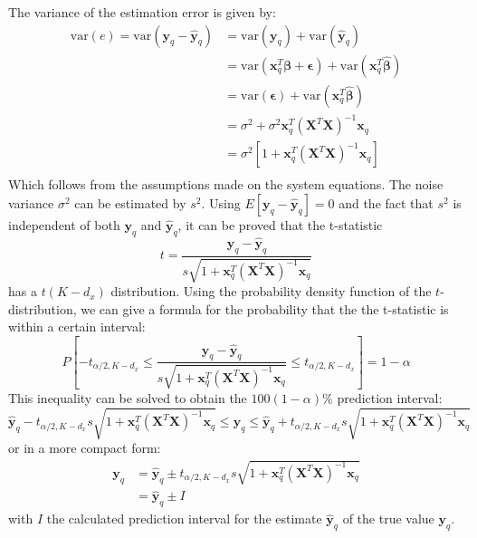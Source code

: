 The variance of the estimation error is given by:
$$
\begin{aligned}
	\textrm{var}(e) = \textrm{var}( \mathbf{y}_q-\hat{\mathbf{y}}_q ) 
	&= \textrm{var}( \mathbf{y}_q ) + \textrm{var}( \hat{\mathbf{y}}_q ) \\
	&= \textrm{var}( \mathbf{x}_q^T\bm{\beta} + \bm{\epsilon}) + \textrm{var}( \mathbf{x}_q^T\hat{\bm{\beta}} ) \\
	&= \textrm{var}( \bm{\epsilon}) + \textrm{var}( \mathbf{x}_q^T\hat{\bm{\beta}} ) \\
	&= \sigma^2 + \sigma^2 \mathbf{x}_q^T \left( \bm{X}^T \bm{X} \right)^{-1} \mathbf{x}_q \\
	&= \sigma^2 \left[ 1 + \mathbf{x}_q^T \left( \bm{X}^T \bm{X} \right)^{-1} \mathbf{x}_q  \right] \\
\end{aligned}
$$
Which follows from the assumptions made on the system equations. The noise variance $\sigma^2$ can be estimated by $s^2$. Using $E\left[ \mathbf{y}_q -\hat{\mathbf{y}}_q \right] = 0$ and the fact that $s^2$ is independent of both $\mathbf{y}_q$ and $\hat{\mathbf{y}}_q$, it can be proved that the t-statistic
$$
	 t = \frac{ \mathbf{y}_q - \mathbf{\hat{y}}_q }{ s \sqrt{1 + \mathbf{x}_q^T \left( \bm{X}^T \mathbf{X} \right)^{-1} \mathbf{x}_q} }
$$
has a $t(K-d_x)$ distribution. Using the probability density function of the $t$-distribution, we can give a formula for the probability that the the t-statistic is within a certain interval:
$$
	P\left[ -t_{\alpha/2,K-d_x} \leq \frac{ \mathbf{y}_q - \mathbf{\hat{y}}_q }{ s \sqrt{1 + \mathbf{x}_q^T \left( \bm{X}^T \bm{X} \right)^{-1} \mathbf{x}_q} } \leq t_{\alpha/2,K-d_x} \right] = 1-\alpha
$$
This inequality can be solved to obtain the $100(1-\alpha)\%$ prediction interval:
$$
 \mathbf{\hat{y}}_q -t_{\alpha/2,K-d_x} s \sqrt{1 + \mathbf{x}_q^T \left( \bm{X}^T \bm{X} \right)^{-1} \mathbf{x}_q}  \leq \mathbf{y}_q \leq \mathbf{\hat{y}}_q +t_{\alpha/2,K-d_x} s \sqrt{1 + \mathbf{x}_q^T \left( \bm{X}^T \bm{X} \right)^{-1} \mathbf{x}_q}
$$
or in a more compact form:
$$
\begin{aligned}
	\mathbf{y}_q &= \mathbf{\hat{y}}_q \pm t_{\alpha/2,K-d_x} s \sqrt{1 + \mathbf{x}_q^T \left( \bm{X}^T \bm{X} \right)^{-1} \mathbf{x}_q} \\
	& = \mathbf{\hat{y}}_q \pm I
\end{aligned}
$$
with $I$ the calculated prediction interval for the estimate $\mathbf{\hat{y}}_q$ of the true value $\mathbf{y}_q$.



